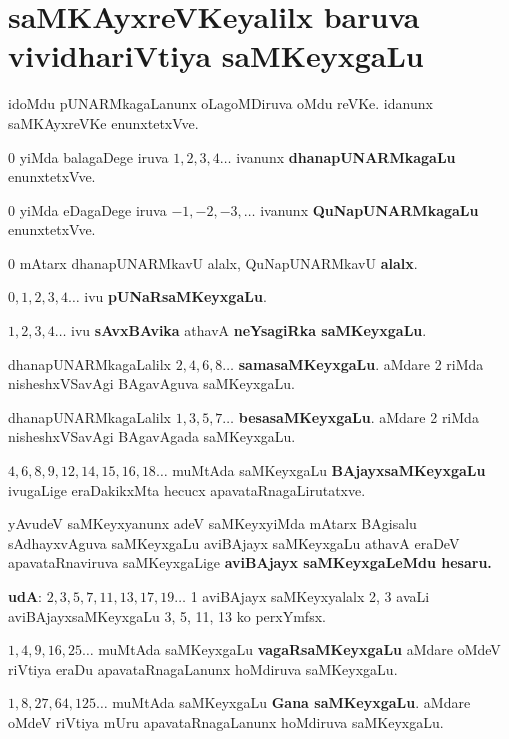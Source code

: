 \chapter{saMKAyxreVKeyalilx baruva vividhariVtiya saMKeyxgaLu}

\begin{figure}[!h]
\end{figure}
idoMdu pUNARMkagaLanunx oLagoMDiruva oMdu reVKe. idanunx saMKAyxreVKe enunxtetxVve.

$0$ yiMda balagaDege iruva $1,2,3,4\ldots$ ivanunx \textbf{dhanapUNARMkagaLu} enunxtetxVve.

$0$ yiMda eDagaDege iruva $-1, -2, -3, \ldots$ ivanunx \textbf{QuNapUNARMkagaLu} enunxtetxVve.

$0$ mAtarx dhanapUNARMkavU alalx, QuNapUNARMkavU \textbf{alalx}.

$0, 1, 2, 3, 4\ldots$ ivu \textbf{pUNaRsaMKeyxgaLu}.

$1, 2, 3, 4\ldots$ ivu \textbf{sAvxBAvika} athavA \textbf{neYsagiRka saMKeyxgaLu}.

dhanapUNARMkagaLalilx $2, 4, 6, 8\ldots$ \textbf{samasaMKeyxgaLu}. aMdare {\rm 2} riMda nisheshxVSavAgi BAgavAguva saMKeyxgaLu.

dhanapUNARMkagaLalilx $1, 3, 5, 7\ldots$ \textbf{besasaMKeyxgaLu}. aMdare {\rm 2} riMda nisheshxVSavAgi BAgavAgada saMKeyxgaLu.

$4, 6, 8, 9, 12, 14, 15, 16, 18\ldots$ muMtAda saMKeyxgaLu \textbf{BAjayxsaMKeyxgaLu} ivugaLige eraDakikxMta hecucx apavataRnagaLirutatxve.

yAvudeV saMKeyxyanunx adeV saMKeyxyiMda mAtarx BAgisalu sAdhayxvAguva saMKeyxgaLu aviBAjayx saMKeyxgaLu athavA eraDeV apavataRnaviruva saMKeyxgaLige \textbf{aviBAjayx saMKeyxgaLeMdu hesaru.}

\textbf{udA}: $2, 3, 5, 7, 11, 13, 17, 19 \ldots$ {\rm 1} aviBAjayx saMKeyxyalalx {\rm 2, 3} avaLi aviBAjayxsaMKeyxgaLu {\rm 3, 5}, {\rm 11, 13} ko perxYmfsx.

$1, 4, 9, 16, 25\ldots$ muMtAda saMKeyxgaLu \textbf{vagaRsaMKeyxgaLu} aMdare oMdeV riVtiya eraDu apavataRnagaLanunx hoMdiruva saMKeyxgaLu.

$1, 8, 27, 64, 125\ldots$ muMtAda saMKeyxgaLu \textbf{Gana saMKeyxgaLu}. aMdare oMdeV riVtiya mUru apavataRnagaLanunx hoMdiruva saMKeyxgaLu.

